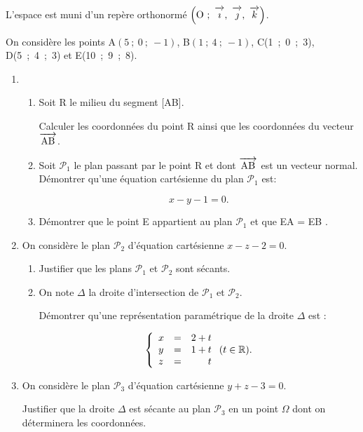 \documentclass[10pt,a4paper]{article}
\newcommand{\R}{\mathbb{R}}
\newcommand{\vect}[1]{\overrightarrow{\,\mathstrut#1\,}}
\def\Oijk{$\left(\text{O}~;~\vect{\imath},~\vect{\jmath},~\vect{k}\right)$}
\begin{document}
\medskip

L'espace est muni d'un repère orthonormé \Oijk.

On considère les points A$(5~;~0~;~-1)$, B$(1~;~4~;~-1)$, C(1~;~0~;~3), D(5~;~4~;~3) et E(10~;~9~;~8).

\medskip

\begin{enumerate}
\item 
	\begin{enumerate}
		\item Soit R le milieu du segment [AB].
		
Calculer les coordonnées du point R ainsi que les coordonnées du vecteur $\vect{\text{AB}}$.
		\item Soit $\mathcal{P}_1$ le plan passant par le point R et dont $\vect{\text{AB}}$ est un vecteur normal. Démontrer qu'une équation cartésienne du plan $\mathcal{P}_1$ est:

\[x - y - 1 = 0.\]
		\item Démontrer que le point E appartient au plan $\mathcal{P}_1$ et que EA = EB .
	\end{enumerate}	
\item  On considère le plan $\mathcal{P}_2$ d'équation cartésienne $x - z - 2 = 0$. 
	\begin{enumerate}
		\item Justifier que les plans $\mathcal{P}_1$ et $\mathcal{P}_2$ sont sécants.
		\item On note $\Delta$ la droite d'intersection de $\mathcal{P}_1$ et $\mathcal{P}_2$.
		
Démontrer qu'une représentation paramétrique de la droite $\Delta$ est :

\[\left\{\begin{array}{l c r}
x&=&2+t\\
y&=&1+t \\
z&=&t\end{array}\right.(t \in \R).\]

	\end{enumerate}
\item  On considère le plan $\mathcal{P}_3$ d'équation cartésienne $y + z - 3 = 0$.

Justifier que la droite $\Delta$ est sécante au plan $\mathcal{P}_3$ en un point $\Omega$ dont on déterminera les coordonnées.
\end{enumerate}
\end{document}
